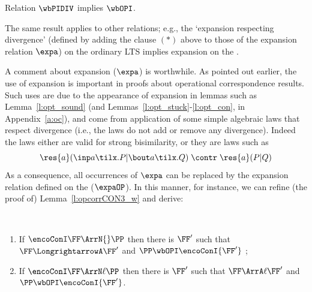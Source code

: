 \begin{lemma}
\label{l:bisDIV_op}
Relation $\wbPIDIV$ implies $\wbOPI$.
\end{lemma} 
\noindent
The same result applies to  other relations; e.g., the `expansion  respecting divergence'
(defined by adding the clause $(*)$ above to those of the expansion
relation $\expa$)
 on the ordinary LTS implies expansion  on the \opLTS.

A comment about expansion ($\expa$) is worthwhile. 
As pointed out earlier,   the use of expansion
is important in proofs  about operational correspondence results. 
Such uses are  due to 
the appearance of expansion in 
 lemmas such as  
 Lemma~\ref{l:opt_sound} (and Lemmas~\ref{l:opt_stuck}-\ref{l:opt_con}, in
 Appendix~\ref{a:oc}),
 and
come from application of some
simple algebraic laws that respect  divergence (i.e., the laws do not add or remove any
divergence). Indeed the laws either are valid for strong bisimilarity, or they are laws
such as 
\[ 
{\res{a} ( \inp a {\tilx}.P | \bout a \tilx . Q)} \;  \contr \;
{\res{a} (P |  Q)  }
 \]
As a consequence, all occurrences of $\expa$ 
can be replaced by the expansion relation defined on the \opLTS ($\expaOP$). 
In this manner, for instance, we can   refine (the proof of)  Lemma~\ref{l:opcorrCON3_w}
and derive: 

 \begin{theorem} %
 \label{t:opcorrCON3_w}
$ $ \begin{enumerate}


\item If 
$ \encoConI \FF \ArrN {} \PP$ then there is $\FF'$ such that 
$\FF \LongrightarrowA \FF'$  and  
$\PP  \wbOPI 
 \encoConI {\FF'}$ ; 


\item If
$ \encoConI \FF \ArrN\ell \PP$
 then there is $\FF'$ such that
 $\FF \ArrA\ell \FF'$
and $\PP \wbOPI \encoConI {\FF'}$.
\end{enumerate} 
\end{theorem} 

